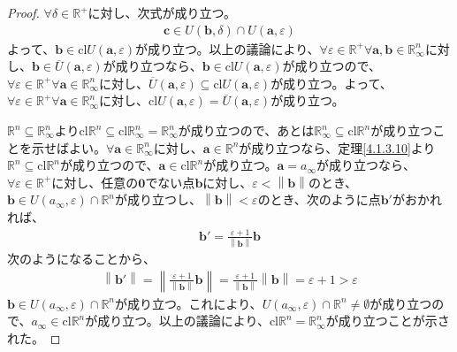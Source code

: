 \documentclass[dvipdfmx]{jsarticle}
\begin{document}
\begin{proof}
$\forall\delta \in \mathbb{R}^{+}$に対し、次式が成り立つ。
\begin{align*}
\mathbf{c} \in U\left( \mathbf{b},\delta \right) \cap U\left( \mathbf{a},\varepsilon \right)
\end{align*}
よって、$\mathbf{b} \in \mathrm{cl}{U\left( \mathbf{a},\varepsilon \right)}$が成り立つ。以上の議論により、$\forall\varepsilon \in \mathbb{R}^{+}\forall\mathbf{a,b} \in \mathbb{R}_{\infty}^{n}$に対し、$\mathbf{b} \in \overline{U}\left( \mathbf{a},\varepsilon \right)$が成り立つなら、$\mathbf{b} \in \mathrm{cl}{U\left( \mathbf{a},\varepsilon \right)}$が成り立つので、$\forall\varepsilon \in \mathbb{R}^{+}\forall\mathbf{a} \in \mathbb{R}_{\infty}^{n}$に対し、$\overline{U}\left( \mathbf{a},\varepsilon \right) \subseteq \mathrm{cl}{U\left( \mathbf{a},\varepsilon \right)}$が成り立つ。よって、$\forall\varepsilon \in \mathbb{R}^{+}\forall\mathbf{a} \in \mathbb{R}_{\infty}^{n}$に対し、$\mathrm{cl}{U\left( \mathbf{a},\varepsilon \right)} = \overline{U}\left( \mathbf{a},\varepsilon \right)$が成り立つ。\par
$\mathbb{R}^{n} \subseteq \mathbb{R}_{\infty}^{n}$より$\mathrm{cl}\mathbb{R}^{n} \subseteq \mathrm{cl}\mathbb{R}_{\infty}^{n} = \mathbb{R}_{\infty}^{n}$が成り立つので、あとは$\mathbb{R}_{\infty}^{n} \subseteq \mathrm{cl}\mathbb{R}^{n}$が成り立つことを示せばよい。$\forall\mathbf{a} \in \mathbb{R}_{\infty}^{n}$に対し、$\mathbf{a} \in \mathbb{R}^{n}$が成り立つなら、定理\ref{4.1.3.10}より$\mathbb{R}^{n} \subseteq \mathrm{cl}\mathbb{R}^{n}$が成り立つので、$\mathbf{a} \in \mathrm{cl}\mathbb{R}^{n}$が成り立つ。$\mathbf{a} = a_{\infty}$が成り立つなら、$\forall\varepsilon \in \mathbb{R}^{+}$に対し、任意の$\mathbf{0}$でない点$\mathbf{b}$に対し、$\varepsilon < \left\| \mathbf{b} \right\|$のとき、$\mathbf{b} \in U\left( a_{\infty},\varepsilon \right) \cap \mathbb{R}^{n}$が成り立つし、$\left\| \mathbf{b} \right\| < \varepsilon$のとき、次のように点$\mathbf{b}'$がおかれれば、
\begin{align*}
\mathbf{b}' = \frac{\varepsilon + 1}{\left\| \mathbf{b} \right\|}\mathbf{b}
\end{align*}
次のようになることから、
\begin{align*}
\left\| \mathbf{b}' \right\| = \left\| \frac{\varepsilon + 1}{\left\| \mathbf{b} \right\|}\mathbf{b} \right\| = \frac{\varepsilon + 1}{\left\| \mathbf{b} \right\|}\left\| \mathbf{b} \right\| = \varepsilon + 1 > \varepsilon
\end{align*}
$\mathbf{b} \in U\left( a_{\infty},\varepsilon \right) \cap \mathbb{R}^{n}$が成り立つ。これにより、$U\left( a_{\infty},\varepsilon \right) \cap \mathbb{R}^{n} \neq \emptyset$が成り立つので、$a_{\infty} \in \mathrm{cl}\mathbb{R}^{n}$が成り立つ。以上の議論により、$\mathrm{cl}\mathbb{R}^{n} = \mathbb{R}_{\infty}^{n}$が成り立つことが示された。\par

\end{proof}
\end{document}
